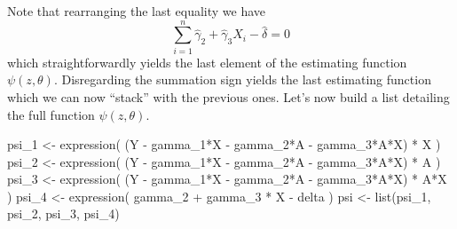 \documentclass[
]{article}
\newenvironment{Shaded}{\begin{snugshade}}{\end{snugshade}}
\newcommand{\FunctionTok}[1]{\textcolor[rgb]{0.00,0.00,0.00}{#1}}
\newcommand{\NormalTok}[1]{#1}
\newcommand{\OtherTok}[1]{\textcolor[rgb]{0.56,0.35,0.01}{#1}}
\newcommand{\SpecialCharTok}[1]{\textcolor[rgb]{0.00,0.00,0.00}{#1}}
\begin{document}
\begin{Shaded}
\end{Shaded}

Note that rearranging the last equality we have
\[\sum_{i=1}^n \hat{\gamma}_2 +\hat{\gamma}_3 X_i - \hat{\delta} = 0\]
which straightforwardly yields the last element of the estimating
function \(\psi(z,\theta)\). Disregarding the summation sign yields the
last estimating function which we can now ``stack'' with the previous
ones. Let's now build a list detailing the full function
\(\psi(z,\theta)\).

\begin{Shaded}
\begin{Highlighting}[]
\NormalTok{psi\_1 }\OtherTok{\textless{}{-}} \FunctionTok{expression}\NormalTok{( (Y }\SpecialCharTok{{-}}\NormalTok{ gamma\_1}\SpecialCharTok{*}\NormalTok{X }\SpecialCharTok{{-}}\NormalTok{ gamma\_2}\SpecialCharTok{*}\NormalTok{A }\SpecialCharTok{{-}}\NormalTok{ gamma\_3}\SpecialCharTok{*}\NormalTok{A}\SpecialCharTok{*}\NormalTok{X) }\SpecialCharTok{*}\NormalTok{ X )}
\NormalTok{psi\_2 }\OtherTok{\textless{}{-}} \FunctionTok{expression}\NormalTok{( (Y }\SpecialCharTok{{-}}\NormalTok{ gamma\_1}\SpecialCharTok{*}\NormalTok{X }\SpecialCharTok{{-}}\NormalTok{ gamma\_2}\SpecialCharTok{*}\NormalTok{A }\SpecialCharTok{{-}}\NormalTok{ gamma\_3}\SpecialCharTok{*}\NormalTok{A}\SpecialCharTok{*}\NormalTok{X) }\SpecialCharTok{*}\NormalTok{ A )}
\NormalTok{psi\_3 }\OtherTok{\textless{}{-}} \FunctionTok{expression}\NormalTok{( (Y }\SpecialCharTok{{-}}\NormalTok{ gamma\_1}\SpecialCharTok{*}\NormalTok{X }\SpecialCharTok{{-}}\NormalTok{ gamma\_2}\SpecialCharTok{*}\NormalTok{A }\SpecialCharTok{{-}}\NormalTok{ gamma\_3}\SpecialCharTok{*}\NormalTok{A}\SpecialCharTok{*}\NormalTok{X) }\SpecialCharTok{*}\NormalTok{ A}\SpecialCharTok{*}\NormalTok{X )}
\NormalTok{psi\_4 }\OtherTok{\textless{}{-}} \FunctionTok{expression}\NormalTok{( gamma\_2 }\SpecialCharTok{+}\NormalTok{ gamma\_3 }\SpecialCharTok{*}\NormalTok{ X }\SpecialCharTok{{-}}\NormalTok{ delta )}
\NormalTok{psi }\OtherTok{\textless{}{-}} \FunctionTok{list}\NormalTok{(psi\_1, psi\_2, psi\_3, psi\_4)}
\end{Highlighting}
\end{Shaded}
\end{document}
